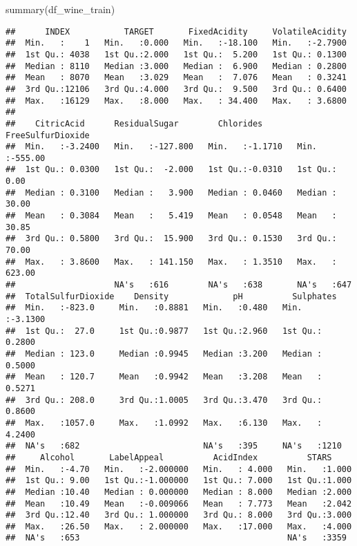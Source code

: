 \documentclass[
]{article}
\newenvironment{Shaded}{\begin{snugshade}}{\end{snugshade}}
\newcommand{\FunctionTok}[1]{\textcolor[rgb]{0.00,0.00,0.00}{#1}}
\newcommand{\NormalTok}[1]{#1}
\begin{document}
\begin{Shaded}
\begin{Highlighting}[]
\FunctionTok{summary}\NormalTok{(df\_wine\_train)}
\end{Highlighting}
\end{Shaded}

\begin{verbatim}
##      INDEX           TARGET       FixedAcidity     VolatileAcidity  
##  Min.   :    1   Min.   :0.000   Min.   :-18.100   Min.   :-2.7900  
##  1st Qu.: 4038   1st Qu.:2.000   1st Qu.:  5.200   1st Qu.: 0.1300  
##  Median : 8110   Median :3.000   Median :  6.900   Median : 0.2800  
##  Mean   : 8070   Mean   :3.029   Mean   :  7.076   Mean   : 0.3241  
##  3rd Qu.:12106   3rd Qu.:4.000   3rd Qu.:  9.500   3rd Qu.: 0.6400  
##  Max.   :16129   Max.   :8.000   Max.   : 34.400   Max.   : 3.6800  
##                                                                     
##    CitricAcid      ResidualSugar        Chlorides       FreeSulfurDioxide
##  Min.   :-3.2400   Min.   :-127.800   Min.   :-1.1710   Min.   :-555.00  
##  1st Qu.: 0.0300   1st Qu.:  -2.000   1st Qu.:-0.0310   1st Qu.:   0.00  
##  Median : 0.3100   Median :   3.900   Median : 0.0460   Median :  30.00  
##  Mean   : 0.3084   Mean   :   5.419   Mean   : 0.0548   Mean   :  30.85  
##  3rd Qu.: 0.5800   3rd Qu.:  15.900   3rd Qu.: 0.1530   3rd Qu.:  70.00  
##  Max.   : 3.8600   Max.   : 141.150   Max.   : 1.3510   Max.   : 623.00  
##                    NA's   :616        NA's   :638       NA's   :647      
##  TotalSulfurDioxide    Density             pH          Sulphates      
##  Min.   :-823.0     Min.   :0.8881   Min.   :0.480   Min.   :-3.1300  
##  1st Qu.:  27.0     1st Qu.:0.9877   1st Qu.:2.960   1st Qu.: 0.2800  
##  Median : 123.0     Median :0.9945   Median :3.200   Median : 0.5000  
##  Mean   : 120.7     Mean   :0.9942   Mean   :3.208   Mean   : 0.5271  
##  3rd Qu.: 208.0     3rd Qu.:1.0005   3rd Qu.:3.470   3rd Qu.: 0.8600  
##  Max.   :1057.0     Max.   :1.0992   Max.   :6.130   Max.   : 4.2400  
##  NA's   :682                         NA's   :395     NA's   :1210     
##     Alcohol       LabelAppeal          AcidIndex          STARS      
##  Min.   :-4.70   Min.   :-2.000000   Min.   : 4.000   Min.   :1.000  
##  1st Qu.: 9.00   1st Qu.:-1.000000   1st Qu.: 7.000   1st Qu.:1.000  
##  Median :10.40   Median : 0.000000   Median : 8.000   Median :2.000  
##  Mean   :10.49   Mean   :-0.009066   Mean   : 7.773   Mean   :2.042  
##  3rd Qu.:12.40   3rd Qu.: 1.000000   3rd Qu.: 8.000   3rd Qu.:3.000  
##  Max.   :26.50   Max.   : 2.000000   Max.   :17.000   Max.   :4.000  
##  NA's   :653                                          NA's   :3359
\end{verbatim}
\end{document}

